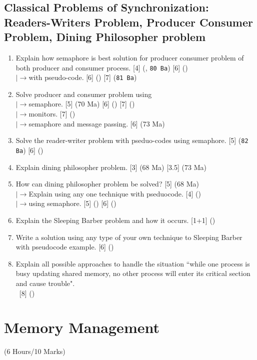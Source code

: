 \documentclass[12pt]{article}
\newcommand{\lb}{\\$\left|\rightarrow\right.$}
\newcommand{\enter}{\\\textcolor{white}{1}}
\begin{document}
	\subsection{Classical Problems of Synchronization: Readers-Writers Problem, Producer Consumer Problem, Dining Philosopher problem}
		\begin{enumerate}[topsep=0pt]
			\item Explain how semaphore is best solution for producer consumer problem of both producer and consumer process. \hfill [4] (, \texttt{80 Ba}) [6] ()
			\lb with pseudo-code. \hfill [6] () [7] (\texttt{81 Ba})
			
			\item Solve producer and consumer problem using 
			\lb semaphore. \hfill [5] (70 Ma) [6] () [7] () 
			\lb monitors. \hfill [7] ()
			\lb semaphore and message passing. \hfill [6] (73 Ma)
			
			\item Solve the reader-writer problem with pseduo-codes using semaphore. \hfill [5] (\texttt{82 Ba}) [6] ()
			
			\item Explain dining philosopher problem. \hfill [3] (68 Ma) [3.5] (73 Ma)
			
			\item How can dining philosopher problem be solved? \hfill [5] (68 Ma)
			\lb Explain using any one technique with pseduocode. \hfill [4] ()
			\lb using semaphore. \hfill [5] () [6] ()
			
			\item Explain the Sleeping Barber problem and how it occurs. \hfill [1+1] ()
			
			\item Write a solution using any type of your own technique to Sleeping Barber with pseudocode example. \hfill [6] ()
			
			\item Explain all possible approaches to handle the situation ``while one process is busy updating shared memory, no other process will enter its critical section and cause trouble".
			\enter\hfill [8] ()
		\end{enumerate}

	\pagebreak

\section{Memory Management}
	\begin{center}(6 Hours/10 Marks)\end{center}
	
\end{document}
